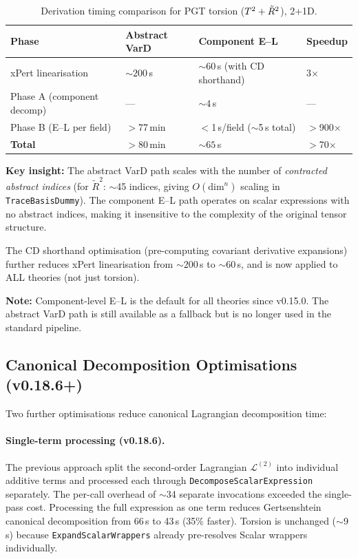 \begin{table}[htbp]
\centering
\caption{Derivation timing comparison for PGT torsion ($T^2 + \tilde{R}^2$), 2+1D.}
\label{tab:component-el-timing}
\begin{tabular}{@{}llll@{}}
\toprule
Phase & Abstract VarD & Component E--L & Speedup \\
\midrule
xPert linearisation & ${\sim}200$\,s & ${\sim}60$\,s (with CD shorthand) & 3$\times$ \\
Phase A (component decomp) & --- & ${\sim}4$\,s & --- \\
Phase B (E--L per field) & $>$77\,min & $<$1\,s/field ($\sim$5\,s total) & $>$900$\times$ \\
\midrule
\textbf{Total} & $>$80\,min & ${\sim}65$\,s & $>$70$\times$ \\
\bottomrule
\end{tabular}
\end{table}

\textbf{Key insight:} The abstract VarD path scales with the number of \emph{contracted abstract indices} (for $\tilde{R}^2$: $\sim$45 indices, giving $O(\text{dim}^{n})$ scaling in \texttt{TraceBasisDummy}). The component E--L path operates on scalar expressions with no abstract indices, making it insensitive to the complexity of the original tensor structure.

The CD shorthand optimisation (pre-computing covariant derivative expansions) further reduces xPert linearisation from ${\sim}200$\,s to ${\sim}60$\,s, and is now applied to ALL theories (not just torsion).

\textbf{Note:} Component-level E--L is the default for all theories since v0.15.0. The abstract VarD path is still available as a fallback but is no longer used in the standard pipeline.

\subsection{Canonical Decomposition Optimisations (v0.18.6+)}
\label{sec:canonical-decomp-perf}

Two further optimisations reduce canonical Lagrangian decomposition time:

\paragraph{Single-term processing (v0.18.6).}
The previous approach split the second-order Lagrangian $\mathcal{L}^{(2)}$ into individual additive terms and processed each through \texttt{DecomposeScalarExpression} separately. The per-call overhead of $\sim$34 separate invocations exceeded the single-pass cost. Processing the full expression as one term reduces Gertsenshtein canonical decomposition from 66\,s to 43\,s (35\% faster). Torsion is unchanged ($\sim$9\,s) because \texttt{ExpandScalarWrappers} already pre-resolves Scalar wrappers individually.

